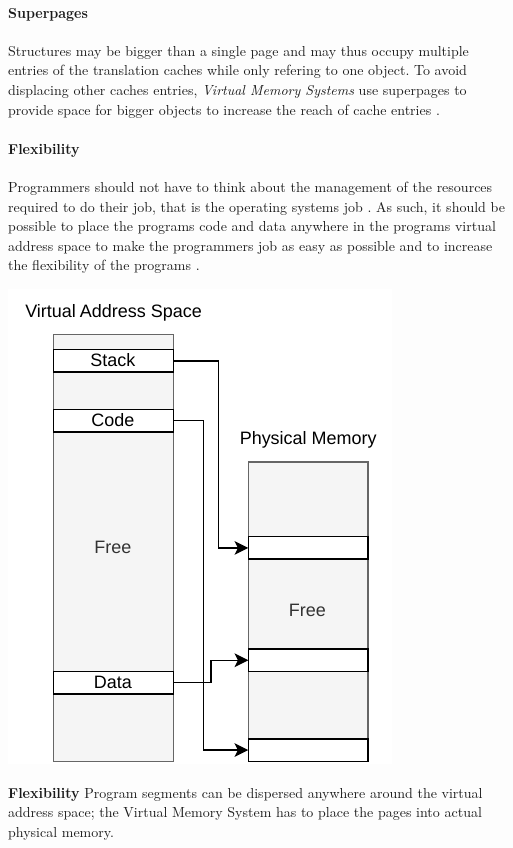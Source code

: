 
\paragraph{Superpages}
Structures may be bigger than a single page and may thus occupy multiple entries of the translation caches while
only refering to one object. To avoid displacing other caches entries, \textit{Virtual Memory Systems} use
superpages to provide space for bigger objects to increase the reach of cache entries \cite{jacobSoftwaremanagedAddressTranslation1997}.


\paragraph{Flexibility} Programmers should not have to think about the management
of the resources required to do their job, that is the operating systems job
\cite{tanenbaumOS}. As such, it should be possible to place the programs code
and data anywhere in the programs virtual address space to make the programmers
job as easy as possible and to increase the flexibility of the programs
\cite{jacob1998virtualissues}. %

\begin{marginfigure}
    \includegraphics*[width=0.9\marginparwidth]{figures/fund_flexibility.pdf}
    \caption{\textbf{Flexibility} Program segments can be dispersed anywhere
        around the virtual address space; the Virtual Memory System has to place
        the pages into actual physical memory.}
\end{marginfigure}

